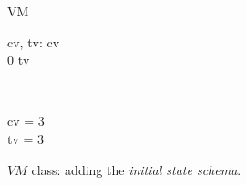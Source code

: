 \begin{figure}[H]
\centering
\begin{class}{VM}
\begin{state}
cv, tv: \integer
{} \leq  cv 
\\
0 \leq  tv 
\end{state} 
\\
\begin{init}
cv = 3
\\tv = 3
\end{init} 
\end{class}
\caption{$VM$ class: adding the \textit{initial state schema}.}
\label{oz_vm_init_schema}
\end{figure}